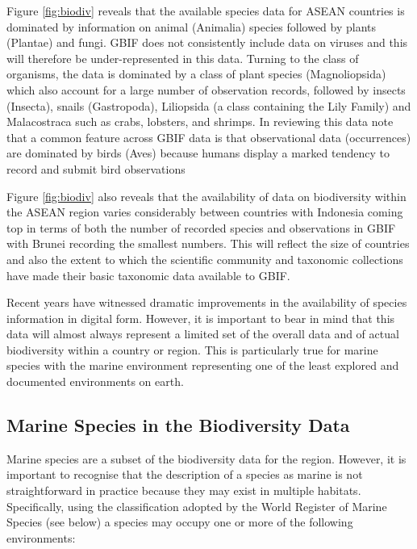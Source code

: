 \documentclass[]{book}
\theoremstyle{definition}
\theoremstyle{definition}
\theoremstyle{definition}
\theoremstyle{remark}
\begin{document}
Figure \ref{fig:biodiv} reveals that the available species data for
ASEAN countries is dominated by information on animal (Animalia) species
followed by plants (Plantae) and fungi. GBIF does not consistently
include data on viruses and this will therefore be under-represented in
this data. Turning to the class of organisms, the data is dominated by a
class of plant species (Magnoliopsida) which also account for a large
number of observation records, followed by insects (Insecta), snails
(Gastropoda), Liliopsida (a class containing the Lily Family) and
Malacostraca such as crabs, lobsters, and shrimps. In reviewing this
data note that a common feature across GBIF data is that observational
data (occurrences) are dominated by birds (Aves) because humans display
a marked tendency to record and submit bird observations

Figure \ref{fig:biodiv} also reveals that the availability of data on
biodiversity within the ASEAN region varies considerably between
countries with Indonesia coming top in terms of both the number of
recorded species and observations in GBIF with Brunei recording the
smallest numbers. This will reflect the size of countries and also the
extent to which the scientific community and taxonomic collections have
made their basic taxonomic data available to GBIF.

Recent years have witnessed dramatic improvements in the availability of
species information in digital form. However, it is important to bear in
mind that this data will almost always represent a limited set of the
overall data and of actual biodiversity within a country or region. This
is particularly true for marine species with the marine environment
representing one of the least explored and documented environments on
earth.

\hypertarget{marine-species-in-the-biodiversity-data}{%
\subsection{Marine Species in the Biodiversity
Data}\label{marine-species-in-the-biodiversity-data}}

Marine species are a subset of the biodiversity data for the region.
However, it is important to recognise that the description of a species
as marine is not straightforward in practice because they may exist in
multiple habitats. Specifically, using the classification adopted by the
World Register of Marine Species (see below) a species may occupy one or
more of the following environments:
\end{document}
